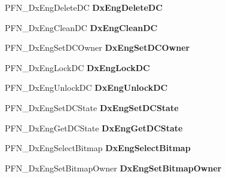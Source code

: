 \begin{DoxyCompactItemize}
\mbox{\label{struct___d_x_e_n_g___f_u_n_c_t_i_o_n_s_a77faaa8cbc501d44ab22bac163fd2c40}} 
P\+F\+N\+\_\+\+Dx\+Eng\+Delete\+DC {\bfseries Dx\+Eng\+Delete\+DC}
\item 
\mbox{\label{struct___d_x_e_n_g___f_u_n_c_t_i_o_n_s_ab51eb97ae35eb996e717ea95802120f6}} 
P\+F\+N\+\_\+\+Dx\+Eng\+Clean\+DC {\bfseries Dx\+Eng\+Clean\+DC}
\item 
\mbox{\label{struct___d_x_e_n_g___f_u_n_c_t_i_o_n_s_ae72b05fe60d4df0b97d892b4466d865a}} 
P\+F\+N\+\_\+\+Dx\+Eng\+Set\+D\+C\+Owner {\bfseries Dx\+Eng\+Set\+D\+C\+Owner}
\item 
\mbox{\label{struct___d_x_e_n_g___f_u_n_c_t_i_o_n_s_a201214ac056491f05eae6467ac2fd033}} 
P\+F\+N\+\_\+\+Dx\+Eng\+Lock\+DC {\bfseries Dx\+Eng\+Lock\+DC}
\item 
\mbox{\label{struct___d_x_e_n_g___f_u_n_c_t_i_o_n_s_ad891a6c0e9164fa305d81c62435370d3}} 
P\+F\+N\+\_\+\+Dx\+Eng\+Unlock\+DC {\bfseries Dx\+Eng\+Unlock\+DC}
\item 
\mbox{\label{struct___d_x_e_n_g___f_u_n_c_t_i_o_n_s_aa0bcded0fbe69966ae317fd727a50be8}} 
P\+F\+N\+\_\+\+Dx\+Eng\+Set\+D\+C\+State {\bfseries Dx\+Eng\+Set\+D\+C\+State}
\item 
\mbox{\label{struct___d_x_e_n_g___f_u_n_c_t_i_o_n_s_aa4d2da0ec8fb78c6fe4277e4feef38e8}} 
P\+F\+N\+\_\+\+Dx\+Eng\+Get\+D\+C\+State {\bfseries Dx\+Eng\+Get\+D\+C\+State}
\item 
\mbox{\label{struct___d_x_e_n_g___f_u_n_c_t_i_o_n_s_a1540fb96184bbf91f29520bbc15a6636}} 
P\+F\+N\+\_\+\+Dx\+Eng\+Select\+Bitmap {\bfseries Dx\+Eng\+Select\+Bitmap}
\item 
\mbox{\label{struct___d_x_e_n_g___f_u_n_c_t_i_o_n_s_a2244ac71b5082abed368c606f55994ca}} 
P\+F\+N\+\_\+\+Dx\+Eng\+Set\+Bitmap\+Owner {\bfseries Dx\+Eng\+Set\+Bitmap\+Owner}

\end{DoxyCompactItemize}
